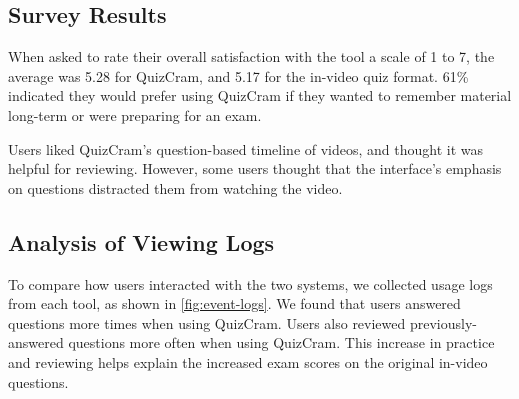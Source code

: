 \documentclass{chi-ext}
\begin{document}
\subsection{Survey Results}

When asked to rate their overall satisfaction with the tool a scale of 1 to 7, the average was 5.28 for QuizCram, and 5.17 for the in-video quiz format.  61\% indicated they would prefer using QuizCram if they wanted to remember material long-term or were preparing for an exam.

Users liked QuizCram's question-based timeline of videos, and thought it was helpful for reviewing. However, some users thought that the interface's emphasis on questions distracted them from watching the video.

\subsection{Analysis of Viewing Logs}


To compare how users interacted with the two systems, we collected usage logs from each tool, as shown in \autoref{fig:event-logs}. We found that users answered questions more times when using QuizCram. Users also reviewed previously-answered questions more often when using QuizCram. This increase in practice and reviewing helps explain the increased exam scores on the original in-video questions. %


\end{document}
